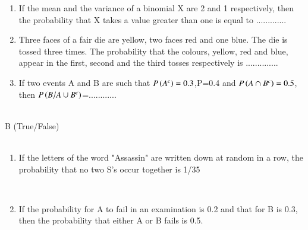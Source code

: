 \documentclass[journal]{IEEEtran}
\numberwithin{equation}{enumi}
\numberwithin{figure}{enumi}
\begin{document}
\begin{enumerate}
    \item If the mean and the variance of a binomial X are 2 and 1 respectively, then the probability that X takes a value greater than one is equal to .............\hfill{}\\ 
    \item Three faces of a fair die are yellow, two faces red and one blue. The die is tossed three times. The probability that the colours, yellow, red and blue, appear in the first, second and the third tosses  respectively is ..............\hfill{}\\
    \item If two events A and B are such that $P\left(A^{c}\right)=0.3$,P=0.4 and $P\left(A \cap B^{c}\right)=0.5$, then $P\left(B/A \cup B^{c}\right)$=............ \hfill{}\\\\
\end{enumerate}
B (True/False)\\\\
\begin{enumerate}
    \item If the letters of the word "Assassin" are written down at random in a row, the probability that no two S's occur together is 1/35
    
    \hfill{}\\
    \item If the probability for A to fail in an examination is 0.2 and that for B is 0.3, then the probability that either A or B fails is 0.5.
    
    \hfill{}
\end{enumerate}
\end{document}
